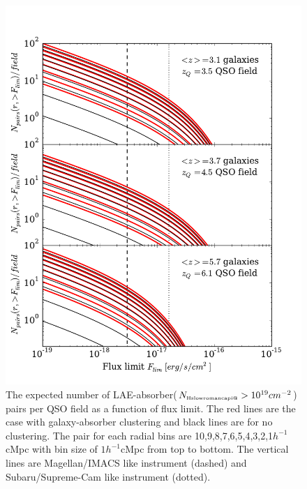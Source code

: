 \documentclass[useAMS,usenatbib,twocolumn]{mn2e}
\makeatletter
\newcommand{\Rmnum}[1]{\expandafter\@slowromancap\romannumeral #1@}
\newcommand{\NHI}{N_{\mbox{\tiny H\Rmnum{1}}}}
\makeatother
\begin{document}
\begin{figure}
 \begin{center}
  \includegraphics[angle=0,width=\columnwidth]{figure/LAE_pair_counts.pdf}
  \caption{The expected number of LAE-absorber($\NHI>10^{19}cm^{-2}$) pairs per
QSO field as a function of flux limit. The red lines are the case with 
galaxy-absorber clustering and black lines are for no clustering. 
The pair for each radial bins are 10,9,8,7,6,5,4,3,2,1$h^{-1}$cMpc
with bin size of $1h^{-1}$cMpc from top to bottom. The vertical lines
are Magellan/IMACS like instrument (dashed) and Subaru/Supreme-Cam like 
instrument (dotted).}\label{LAE_pair_counts}
 \end{center}
\end{figure}
\end{document}
